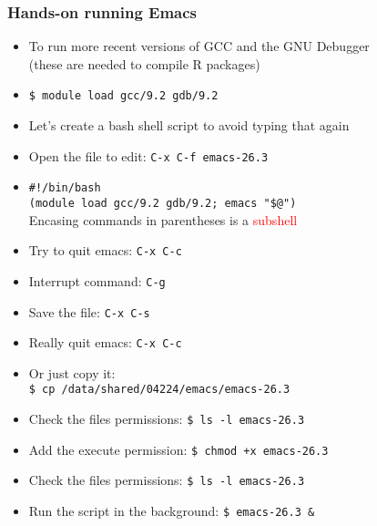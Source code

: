 \documentclass[11pt,pdftex,dvipsnames,usenames,helvetica]{beamer}
\begin{document}
\begin{frame}
\frametitle{Hands-on running Emacs}
\begin{itemize}
\item To run more recent versions of GCC and the GNU Debugger\\ 
(these are needed to compile R packages)
\item {\tt \$ module load gcc/9.2 gdb/9.2}
\item Let's create a bash shell script to avoid typing that again
\item Open the file to edit: {\tt C-x C-f emacs-26.3}
\item {\tt \#!/bin/bash} \\ 
{\tt (module load gcc/9.2 gdb/9.2; emacs "\$@")}\\
Encasing commands in parentheses is a \textcolor{red}{subshell}
\item Try to quit emacs: {\tt C-x C-c}
\item Interrupt command: {\tt C-g}
\item Save the file: {\tt C-x C-s}
\item Really quit emacs: {\tt C-x C-c}
\item Or just copy it:\\ {\tt \$ cp /data/shared/04224/emacs/emacs-26.3 $~$}
\item Check the files permissions: {\tt \$ ls -l emacs-26.3}
\item Add the execute permission: {\tt \$ chmod +x  emacs-26.3}
\item Check the files permissions: {\tt \$ ls -l emacs-26.3}
\item Run the script in the background: {\tt \$ emacs-26.3 \& }
\end{itemize}
\end{frame}
\end{document}
